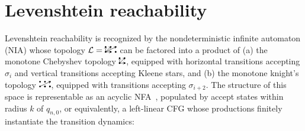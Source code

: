 \documentclass[sigplan,review,anonymous,acmsmall]{acmart}\settopmatter{printfolios=false,printccs=false,printacmref=false}
\begin{document}
\pagebreak
\section{Levenshtein reachability}\label{sec:levenshtein}

Levenshtein reachability is recognized by the nondeterministic infinite automaton (NIA) whose topology $\mathcal{L} = \knightkingarrow$ can be factored into a product of (a) the monotone Chebyshev topology $\kingarrow$, equipped with horizontal transitions accepting $\sigma_{i}$ and vertical transitions accepting Kleene stars, and (b) the monotone knight's topology $\knightarrow$, equipped with transitions accepting $\sigma_{i+2}$. The structure of this space is representable as an acyclic NFA~\cite{schulz2002fast}, populated by accept states within radius $k$ of $q_{n,0}$, or equivalently, a left-linear CFG whose productions finitely instantiate the transition dynamics:
\end{document}
